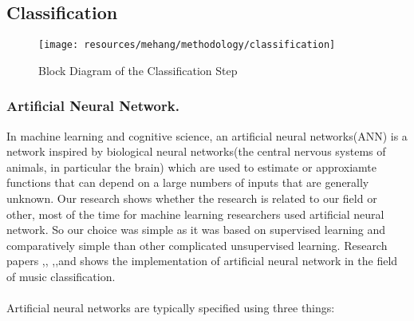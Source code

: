 \newpage


\subsection{Classification}
\begin{figure}[h!]
        \centering
        \texttt{[image: resources/mehang/methodology/classification]}
        \caption{Block Diagram of the Classification Step}
\end{figure}

\subsubsection{Artificial Neural Network.}
In machine learning and cognitive science, an artificial neural networks(ANN) is a network inspired by biological neural networks(the central nervous systems of 
animals, in particular the brain) which are used to estimate or approxiamte functions that can depend on a large numbers of inputs that are generally unknown.
Our research shows whether the research is related to our field or other, most of the time for machine learning researchers used artificial neural network.
So our choice was simple as it was based on supervised learning and comparatively simple than other complicated unsupervised learning.
Research papers \cite{Kour2015},\cite{Anglade2010}, \cite{Neumayer2004}  ,\cite{Koerich2013},\cite{Koerich2013}and \cite{Haggblade2011}   shows the implementation of artificial neural network in the field of
music classification.\\
\\
Artificial neural networks are typically specified using three things:
